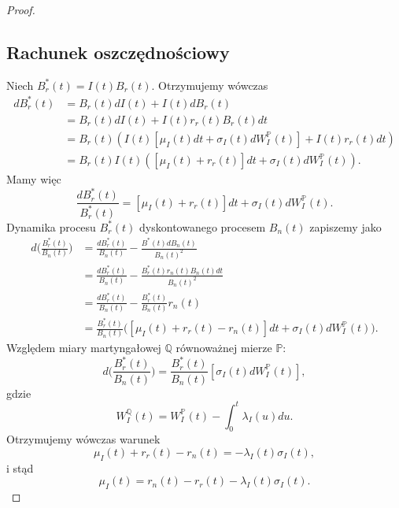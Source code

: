 \documentclass{mini}
\theoremstyle{mythstyle}
\begin{document}
\begin{proof}
	\subsection*{Rachunek oszczędnościowy}
	Niech $B_r^*(t) = I(t) B_r(t)$. Otrzymujemy wówczas
	\begin{align*}
	d B_r^*(t) &= B_r(t) dI(t) + I(t)dB_r(t) \\
	&= B_r(t) dI(t) + I(t)r_r(t) B_r(t) dt \\
	&= B_r(t) (I(t) [\mu_I(t)dt + \sigma_I(t)dW_I^\mathbb{P}(t) ] + I(t)r_r(t)dt) \\
	&= B_r(t) I(t) ([\mu_I(t) + r_r(t) ]dt + \sigma_I(t) dW_I^\mathbb{P}(t)).
	\end{align*}
	Mamy więc
	\begin{equation}
	\frac{dB_r^*(t)}{B_r^*(t)} = [\mu_I(t) + r_r(t) ]dt + \sigma_I(t) dW_I^\mathbb{P}(t).
	\end{equation}
	Dynamika procesu $B_r^*(t)$ dyskontowanego procesem $B_n(t)$ zapiszemy jako
	\begin{align*}
	d\bigg(\frac{B_r^*(t)}{B_n(t)}\bigg) &= \frac{d B_r^*(t)}{B_n(t)} - \frac{B^*(t) d B_n(t)}{B_n(t)^2}\\
	&= \frac{d B_r^*(t)}{B_n(t)} - \frac{B_r^*(t)r_n(t)B_n(t)dt}{B_n(t)^2}\\
	&= \frac{d B_r^*(t)}{B_n(t)} - \frac{B_r^*(t)}{B_n(t)}r_n(t)\\
	&= \frac{B_r^*(t)}{B_n(t)} \bigg( [\mu_I(t) + r_r(t) - r_n(t)]dt + \sigma_I(t) dW_I^\mathbb{P}(t)\bigg).
	\end{align*}
	Względem miary martyngałowej $\mathbb{Q}$ równoważnej mierze $\mathbb{P}$:
	\begin{equation*}
	d\bigg(\frac{B_r^*(t)}{B_n(t)} \bigg) = \frac{B_r^*(t)}{B_n(t)} [\sigma_I(t) dW_I^\mathbb{P}(t)],
	\end{equation*}
	gdzie
	\begin{equation*}
	W_I^\mathbb{Q}(t) = W_I^\mathbb{P}(t) - \int_{0}^{t} \lambda_I(u) du.
	\end{equation*}
	Otrzymujemy wówczas warunek
	\begin{equation}
	\mu_I(t) + r_r(t) - r_n(t) = -\lambda_I(t) \sigma_I(t),
	\end{equation}
	i stąd
	\begin{equation}
	\mu_I(t) =  r_n(t) - r_r(t) - \lambda_I(t) \sigma_I(t).
	\end{equation}
	

\end{proof}
\end{document}
